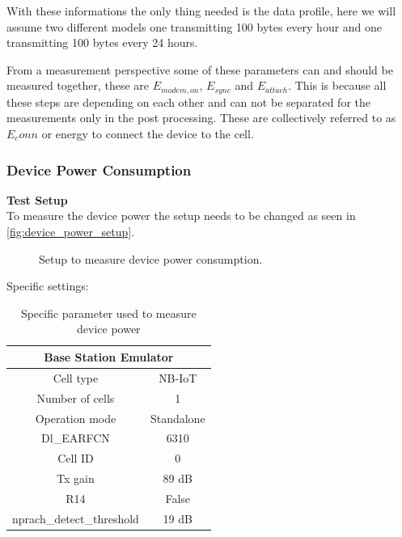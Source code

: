 With these informations the only thing needed is the data profile, here we will assume two different models one transmitting 100 bytes every hour and one transmitting 100 bytes every 24 hours. 

From a measurement perspective some of these parameters can and should be measured together, these are $E_{modem,on}$, $E_{sync}$ and $E_{attach}$. This is because all these steps are depending on each other and can not be separated for the measurements only in the post processing. These are collectively referred to as $E_conn$ or energy to connect the device to the cell. 

\subsubsection{Device Power Consumption}
\textbf{Test Setup}\\
To measure the device power the setup needs to be changed as seen in \autoref{fig:device_power_setup}.
\begin{figure}[H]
\centering
{}
\caption{Setup to measure device power consumption.}
\label{fig:device_power_setup}
\end{figure}

Specific settings:
\begin{table}[H]
\centering
\begin{tabular}{|c|c|} \hline
\multicolumn{2}{|c|}{\textbf{Base Station Emulator}} \\ \hline
Cell type          & NB-IoT         \\ \hline
Number of cells    & 1              \\ \hline
Operation mode     & Standalone     \\ \hline
Dl\_EARFCN         & 6310           \\ \hline
Cell ID            & 0              \\ \hline
Tx gain            & 89 dB          \\ \hline
R14                & False          \\ \hline
nprach\_detect\_threshold  & 19 dB  \\ \hline
\end{tabular}
\caption{Specific parameter used to measure device power}
\label{tab:device_power_settings}
\end{table}


